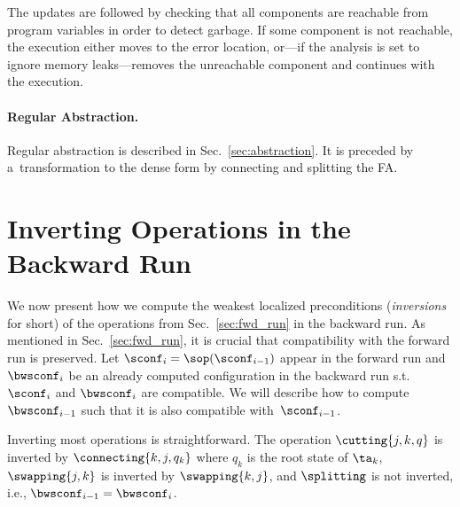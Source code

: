 {\noindent
The updates are followed by checking that all components are reachable from
program variables in order to detect garbage.
If some component is not reachable, the execution either moves to the
error location, or---if the analysis is set to ignore memory leaks---removes the
unreachable component and continues with the execution.

\paragraph{Regular Abstraction.} 

Regular abstraction is described in
Sec.~\ref{sec:abstraction}.
It is preceded by a~transformation to the dense form 
by connecting and splitting the FA.

\section{Inverting Operations in the Backward Run}\label{sec:bwd_run}

We now present how we compute the weakest localized preconditions (\emph{inversions} for short) of the operations from Sec.~\ref{sec:fwd_run} in the backward run.
As mentioned in  Sec.~\ref{sec:fwd_run}, 
it is crucial that compatibility with the forward run is preserved. 
Let $\sconf_i = \sop(\sconf_{i-1})$ appear in the forward run and
$\bwsconf_{i}$ be an already computed configuration in the backward run
s.t.~$\sconf_i$ and $\bwsconf_i$ are compatible.
We will describe how to compute $\bwsconf_{i-1}$ such that it is also
compatible with~$\sconf_{i-1}$.

Inverting most operations is straightforward.
The operation $\cutting{j,k,q}$ is inverted by $\connecting{k,j,q_k}$ where $q_k$ is the root state of $\ta_k$,
$\swapping{j,k}$ is inverted by $\swapping{k,j}$, and $\splitting$ is not inverted, i.e., $\bwsconf_{i-1} = \bwsconf_i$.


}
